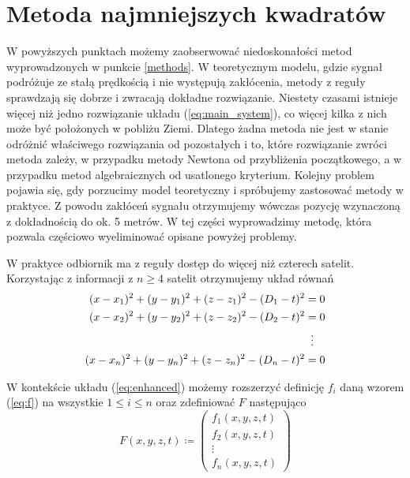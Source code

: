 \documentclass{article}
\begin{document}
\section{Metoda najmniejszych kwadratów}
W powyższych punktach możemy zaobserwować niedoskonałości metod wyprowadzonych w punkcie \ref{methods}.
W teoretycznym modelu, gdzie sygnał podróżuje ze stałą prędkością i nie występują zakłócenia, metody z reguły
sprawdzają się dobrze i zwracają dokładne rozwiązanie. Niestety czasami istnieje więcej niż jedno rozwiązanie układu
(\ref{eq:main_system}), co więcej kilka z nich może być położonych w pobliżu Ziemi. Dlatego żadna metoda nie jest w stanie
odróżnić właściwego rozwiązania od pozostałych i to, które rozwiązanie zwróci metoda zależy, w przypadku metody
Newtona od przybliżenia początkowego, a w przypadku metod algebraicznych od usatlonego kryterium.
Kolejny problem pojawia się, gdy porzucimy model teoretyczny i spróbujemy zastosować metody w praktyce.
Z powodu zakłóceń sygnału otrzymujemy wówczas pozycję wzynaczoną z dokładnością do ok. 5 metrów.
W tej części wyprowadzimy metodę, która pozwala częściowo wyeliminować opisane powyżej problemy.

W praktyce odbiornik ma z reguły dostęp do więcej niż czterech satelit.
Korzystając z informacji z $n \geq 4$ satelit otrzymujemy układ równań
\begin{align}
\begin{aligned}
    \label{eq:enhanced}
    (x-x_1)^2 + (y-y_1)^2 + (z-z_1)^2 - (D_1 -t)^2 &= 0 \\
    (x-x_2)^2 + (y-y_2)^2 + (z-z_2)^2 - (D_2 -t)^2 &= 0 \\
    &\vdotswithin{=} \\
    (x-x_n)^2 + (y-y_n)^2 + (z-z_n)^2 - (D_n -t)^2 &= 0 \\
\end{aligned}
\end{align}

W kontekście układu (\ref{eq:enhanced}) możemy rozszerzyć definicję $f_i$ daną wzorem (\ref{eq:f})
na wszystkie $1 \leq i \leq n$ oraz zdefiniować $F$ następująco
\begin{equation}
    \label{eq:newF}
    F(x, y, z, t) \coloneqq
    \begin{pmatrix}
        f_1(x, y, z, t) \\
        f_2(x, y, z, t) \\
        \vdots \\
        f_n(x, y, z, t)
    \end{pmatrix}
\end{equation}
\end{document}
